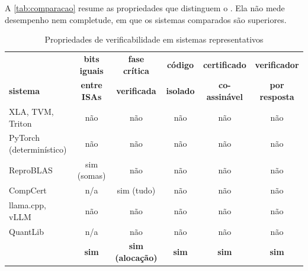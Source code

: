 A \autoref{tab:comparacao} resume as propriedades que distinguem o \vapor{}. Ela não mede desempenho nem completude, em que os sistemas comparados são superiores.

\begin{table}[htbp]
\centering
\caption{Propriedades de verificabilidade em sistemas representativos}\label{tab:comparacao}
\footnotesize\setlength{\tabcolsep}{4pt}
\begin{tabular}{@{}lccccc@{}}
\toprule
 & \textbf{bits iguais} & \textbf{fase crítica} & \textbf{código} & \textbf{certificado} & \textbf{verificador}\\
\textbf{sistema} & \textbf{entre ISAs} & \textbf{verificada} & \textbf{isolado} & \textbf{co-assinável} & \textbf{por resposta}\\
\midrule
XLA, TVM, Triton & não & não & não & não & não\\
PyTorch (determinístico) & não & não & não & não & não\\
ReproBLAS & sim (somas) & não & não & não & não\\
CompCert & n/a & sim (tudo) & não & não & não\\
llama.cpp, vLLM & não & não & não & não & não\\
QuantLib & n/a & não & não & não & não\\
\vapor{} & \textbf{sim} & \textbf{sim (alocação)} & \textbf{sim} & \textbf{sim} & \textbf{sim}\\
\bottomrule
\end{tabular}
\end{table}
